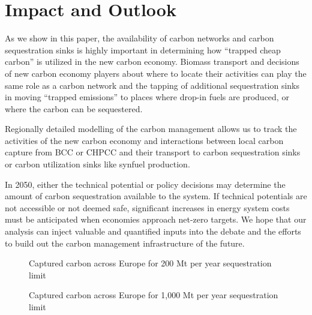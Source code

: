 \documentclass[10pt,5p,reversenotenum,lefttitle]{elsarticle}
\begin{document}
\section*{Impact and Outlook}
\label{sec:outlook}
As we show in this paper, the availability of carbon networks and carbon sequestration sinks is highly important in determining how “trapped cheap carbon” is utilized in the new carbon economy. Biomass transport and decisions of new carbon economy players about where to locate their activities can play the same role as a carbon network and the tapping of additional sequestration sinks in moving “trapped emissions” to places where drop-in fuels are produced, or where the carbon can be sequestered.

Regionally detailed modelling of the carbon management allows us to track the activities of the new carbon economy and interactions between local carbon capture from BCC or CHPCC and their transport to carbon sequestration sinks or carbon utilization sinks like synfuel production.

In 2050, either the technical potential or policy decisions may determine the amount of carbon sequestration available to the system. If technical potentials are not accessible or not deemed safe, significant increases in energy system costs must be anticipated when economies approach net-zero targets. We hope that our analysis can inject valuable and quantified inputs into the debate and the efforts to build out the carbon management infrastructure of the future.

\clearpage

\begin{figure*}[h!]
  \centering
  \caption{Captured carbon across Europe for 200 Mt per year sequestration limit}
  \label{fig:capacity_map_200}
\end{figure*}

\begin{figure*}[h!]
  \centering
  \caption{Captured carbon across Europe for 1,000 Mt per year sequestration limit}
  \label{fig:capacity_map_1000}
\end{figure*}
\end{document}
